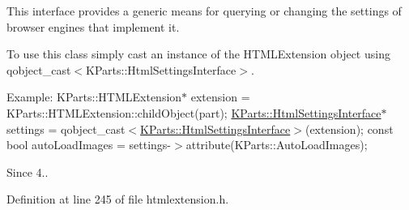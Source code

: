 This interface provides a generic means for querying or changing the settings of browser engines that implement it.

To use this class simply cast an instance of the H\+T\+M\+L\+Extension object using qobject\+\_\+cast$<$\+K\+Parts\+::\+Html\+Settings\+Interface$>$.

Example\+: {\ttfamily  K\+Parts\+::\+H\+T\+M\+L\+Extension$\ast$ extension = K\+Parts\+::\+H\+T\+M\+L\+Extension\+::child\+Object(part); \hyperlink{classKParts_1_1HtmlSettingsInterface}{K\+Parts\+::\+Html\+Settings\+Interface}$\ast$ settings = qobject\+\_\+cast$<$\hyperlink{classKParts_1_1HtmlSettingsInterface}{K\+Parts\+::\+Html\+Settings\+Interface}$>$(extension); const bool auto\+Load\+Images = settings-\/$>$attribute(\+K\+Parts\+::\+Auto\+Load\+Images); }

\begin{DoxySince}{Since}
4.. 
\end{DoxySince}


Definition at line 245 of file htmlextension.\+h.



